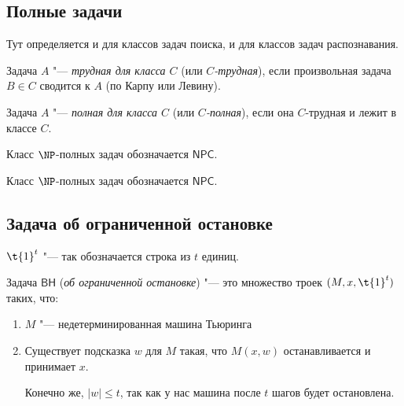 \subsection{Полные задачи}
	Тут определяется и для классов задач поиска, и для классов задач распознавания.

	\begin{Def}
		Задача $A$ "--- \textit{трудная для класса $C$} (или \textit{$C$-трудная}), если произвольная задача $B \in C$ сводится к $A$ (по Карпу или Левину).
	\end{Def}
	\begin{Def}
		Задача $A$ "--- \textit{полная для класса $C$} (или \textit{$C$-полная}), если она $C$-трудная и лежит в классе $C$.
	\end{Def}

	\begin{Def}
		Класс $\NP$-полных задач обозначается $\mathsf{NPC}$.
	\end{Def}
	\begin{Def}
		Класс $\NP$-полных задач обозначается $\mathsf{NPC}$.
	\end{Def}

\subsection{Задача об ограниченной остановке}
	\begin{Def}
		$\t{1}^t$ "--- так обозначается строка из $t$ единиц.
	\end{Def}
	\begin{Def}
		Задача $\mathsf{BH}$ (\textit{об ограниченной остановке}) "--- это множество троек $(M, x, \t{1}^t)$ таких, что:
		\begin{enumerate}
			\item
				$M$ "--- недетерминированная машина Тьюринга
			\item
				Существует подсказка $w$ для $M$ такая, что $M(x, w)$ останавливается и принимает $x$.
				\begin{Rem}
					Конечно же, $|w| \le t$, так как у нас машина после $t$ шагов будет остановлена.
				\end{Rem}
		\end{enumerate}
	\end{Def}

